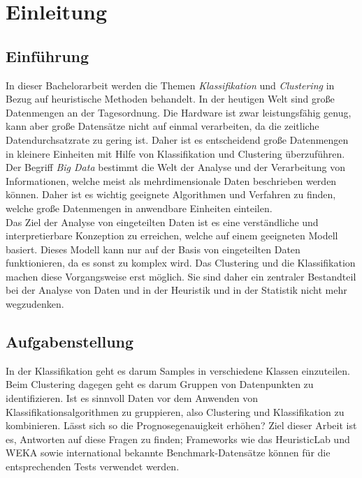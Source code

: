 \chapter{Einleitung}\label{Einleitung}
\section{Einführung}
In dieser Bachelorarbeit werden die Themen \emph{Klassifikation} und \emph{Clustering} in Bezug auf heuristische Methoden behandelt. In der heutigen Welt sind große Datenmengen an der Tagesordnung. Die Hardware ist zwar leistungsfähig genug, kann aber große Datensätze nicht auf einmal verarbeiten, da die zeitliche Datendurchsatzrate zu gering ist. Daher ist es entscheidend große Datenmengen in kleinere Einheiten mit Hilfe von Klassifikation und Clustering überzuführen. Der Begriff \textit{Big Data} bestimmt die Welt der Analyse und der Verarbeitung von Informationen, welche meist als mehrdimensionale Daten beschrieben werden können. Daher ist es wichtig geeignete Algorithmen und Verfahren zu finden, welche große Datenmengen in anwendbare Einheiten einteilen.\\Das Ziel der Analyse von eingeteilten Daten ist es eine verständliche und interpretierbare Konzeption zu erreichen, welche auf einem geeigneten Modell basiert. Dieses Modell kann nur auf der Basis von eingeteilten Daten funktionieren, da es sonst zu komplex wird. Das Clustering und die Klassifikation machen diese Vorgangsweise erst möglich. Sie sind daher ein zentraler Bestandteil bei der Analyse von Daten und in der Heuristik und in der Statistik nicht mehr wegzudenken.  
\section{Aufgabenstellung}
In der Klassifikation geht es darum Samples in verschiedene Klassen einzuteilen. Beim Clustering dagegen geht es darum Gruppen von Datenpunkten zu identifizieren. Ist es sinnvoll Daten vor dem Anwenden von Klassifikationsalgorithmen zu gruppieren, also Clustering und Klassifikation zu kombinieren. Lässt sich so die Prognosegenauigkeit erhöhen? Ziel dieser Arbeit ist es, Antworten auf diese Fragen zu finden; Frameworks wie das HeuristicLab und WEKA sowie international bekannte Benchmark-Datensätze können für die entsprechenden Tests verwendet werden.


